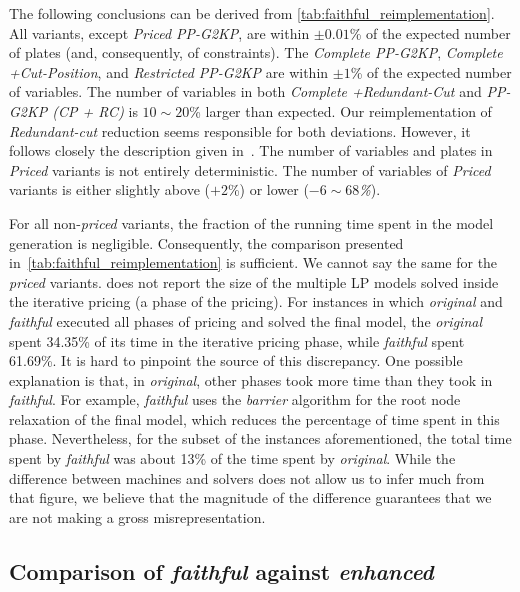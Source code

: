 \documentclass[smallextended]{svjour3}       %
\begin{document}
The following conclusions can be derived from \autoref{tab:faithful_reimplementation}.
All variants, except \emph{Priced PP-G2KP}, are within \(\pm0.01\)\% of the expected number of plates (and, consequently, of constraints).
The \emph{Complete PP-G2KP}, \emph{Complete +Cut-Position}, and \emph{Restricted PP-G2KP} are within \(\pm1\)\% of the expected number of variables.
The number of variables in both \emph{Complete +Redundant-Cut} and \emph{PP-G2KP (CP + RC)} is \(10\sim20\)\% larger than expected.
Our reimplementation of \emph{Redundant-cut} reduction seems responsible for both deviations.
However, it follows closely the description given in~\cite{dimitri_thesis}.
The number of variables and plates in \emph{Priced} variants is not entirely deterministic.
The number of variables of \emph{Priced} variants is either slightly above (\(+2\)\%) or lower (\emph{\(-6\sim68\)\%}).

For all non-\emph{priced} variants, the fraction of the running time spent in the model generation is negligible.
Consequently, the comparison presented in~\autoref{tab:faithful_reimplementation} is sufficient.
We cannot say the same for the \emph{priced} variants.
\cite{furini:2016,dimitri_thesis} does not report the size of the multiple LP models solved inside the iterative pricing (a phase of the pricing).
For instances in which \emph{original} and \emph{faithful} executed all phases of pricing and solved the final model, the \emph{original} spent 34.35\% of its time in the iterative pricing phase, while \emph{faithful} spent 61.69\%.
It is hard to pinpoint the source of this discrepancy.
One possible explanation is that, in \emph{original}, other phases took more time than they took in \emph{faithful}.
For example, \emph{faithful} uses the \emph{barrier} algorithm for the root node relaxation of the final model, which reduces the percentage of time spent in this phase.
Nevertheless, for the subset of the instances aforementioned, the total time spent by \emph{faithful} was about 13\% of the time spent by \emph{original}.
While the difference between machines and solvers does not allow us to infer much from that figure, we believe that the magnitude of the difference guarantees that we are not making a gross misrepresentation.

\subsection{Comparison of \emph{faithful} against \emph{enhanced}}
\label{sec:comparison}
\end{document}
